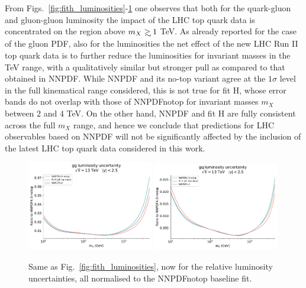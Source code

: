 \documentclass[withindex,glossary]{cam-thesis}
\def\gsim{\mathrel{\rlap{\lower4pt\hbox{\hskip1pt$\sim$}}
    \raise1pt\hbox{$>$}}}
\begin{document}
From Figs.~\ref{fig:fith_luminosities}-\ref{fig:fith_luminosities_unc} one
observes that both
for the quark-gluon and gluon-gluon luminosity the impact
of the LHC top quark data is concentrated on the region above $m_X \gsim 1$ TeV.
%
As already reported for the case of the gluon PDF, also for the luminosities
the net effect of the new LHC Run II top quark data is to further reduce
the luminosities for invariant masses in the TeV range, with a qualitatively
similar but stronger pull as compared to that obtained in NNPDF.
%
While NNPDF and its no-top variant agree at the $1\sigma$ level in the full
kinematical range considered, this is not true for fit H,  whose error bands
do not overlap with those of NNPDFnotop for invariant masses $m_X$ between
2 and 4 TeV.
%
On the other hand, NNPDF and fit H are fully consistent across the full
$m_X$ range, and hence we conclude that predictions for LHC observables
based on NNPDF will not be significantly affected by the inclusion
of the latest LHC top quark data considered in this work.

\begin{figure}[t]
\centering
\includegraphics[width=0.49\textwidth]{pdf_plots/fitH_gg_lumi_unc.pdf}
\includegraphics[width=0.49\textwidth]{pdf_plots/fitH_gq_lumi_unc.pdf}
\caption{Same as Fig.~\ref{fig:fith_luminosities}, now for the
  relative luminosity uncertainties, all normalised to the
  NNPDFnotop baseline fit.
}
\label{fig:fith_luminosities_unc}
\end{figure}
\end{document}
